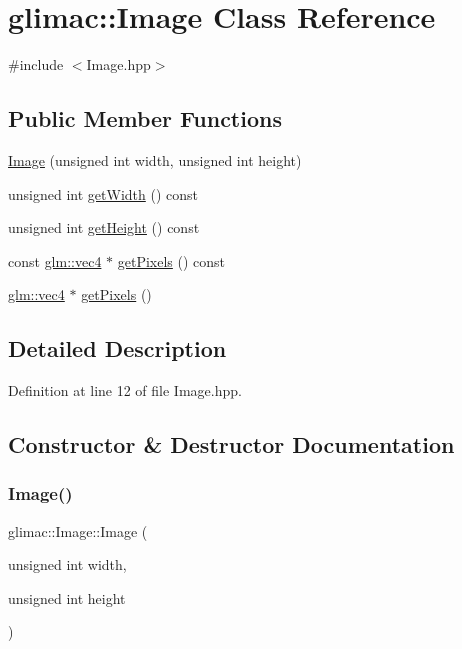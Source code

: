 \hypertarget{classglimac_1_1_image}{}\section{glimac\+:\+:Image Class Reference}
\label{classglimac_1_1_image}


{\ttfamily \#include $<$Image.\+hpp$>$}

\subsection*{Public Member Functions}
\begin{DoxyCompactItemize}
\item 
\hyperlink{classglimac_1_1_image_a8d0769d9756924f57b740e48e9fb09f6}{Image} (unsigned int width, unsigned int height)
\item 
unsigned int \hyperlink{classglimac_1_1_image_a23bc966575ee67b85fc575631b035026}{get\+Width} () const
\item 
unsigned int \hyperlink{classglimac_1_1_image_a0a2afce624e3df2b12d7d76ba0d31c42}{get\+Height} () const
\item 
const \hyperlink{group__core__types_ga5881b1b022d7fd1b7218f5916532dd02}{glm\+::vec4} $\ast$ \hyperlink{classglimac_1_1_image_af2cdd4b884831808f5ecba70209c2f95}{get\+Pixels} () const
\item 
\hyperlink{group__core__types_ga5881b1b022d7fd1b7218f5916532dd02}{glm\+::vec4} $\ast$ \hyperlink{classglimac_1_1_image_a679f8ae515ad9607faa762e1e2105285}{get\+Pixels} ()
\end{DoxyCompactItemize}


\subsection{Detailed Description}


Definition at line 12 of file Image.\+hpp.



\subsection{Constructor \& Destructor Documentation}
\mbox{\label{classglimac_1_1_image_a8d0769d9756924f57b740e48e9fb09f6}} 
\subsubsection{\texorpdfstring{Image()}{Image()}}
{\footnotesize\ttfamily glimac\+::\+Image\+::\+Image (\begin{DoxyParamCaption}\item[{unsigned int}]{width,  }\item[{unsigned int}]{height }\end{DoxyParamCaption})\hspace{0.3cm}{\ttfamily [inline]}}



